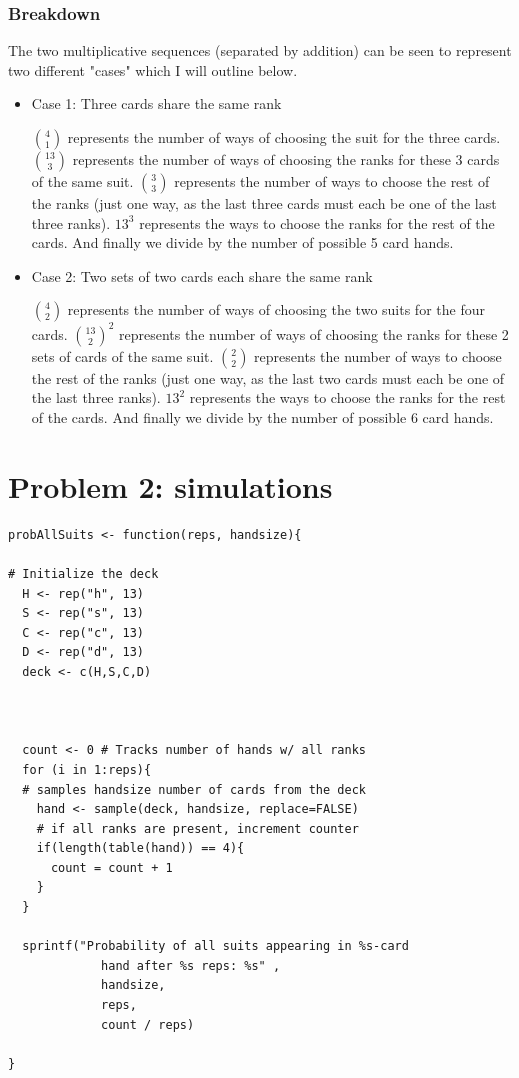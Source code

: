 \documentclass[11pt]{article}
\begin{document}
\subsubsection*{Breakdown}
\label{sec:org119f212}

The two multiplicative sequences (separated by addition) can be seen to represent two different "cases" which I will outline below.

\begin{itemize}
\item Case 1: Three cards share the same rank
\label{sec:org92897a5}

\({4}\choose{1}\) represents the number of ways of choosing the suit for the three cards. \({{13}\choose{3}}\) represents the number of ways of choosing the ranks for these 3 cards of the same suit. \({{3}\choose{3}}\) represents the number of ways to choose the rest of the ranks (just one way, as the last three cards must each be one of the last three ranks). \(13^{3}\) represents the ways to choose the ranks for the rest of the cards. And finally we divide by the number of possible 5 card hands.

\item Case 2: Two sets of two cards each share the same rank
\label{sec:orgfdb33ff}

\({4}\choose{2}\) represents the number of ways of choosing the two suits for the four cards. \({{13}\choose{2}}^{2}\) represents the number of ways of choosing the ranks for these 2 sets of cards of the same suit. \({{2}\choose{2}}\) represents the number of ways to choose the rest of the ranks (just one way, as the last two cards must each be one of the last three ranks). \(13^{2}\) represents the ways to choose the ranks for the rest of the cards. And finally we divide by the number of possible 6 card hands.
\end{itemize}

\section*{Problem 2: simulations}
\label{sec:org76c7cb4}

\begin{verbatim}
probAllSuits <- function(reps, handsize){

# Initialize the deck
  H <- rep("h", 13)
  S <- rep("s", 13)
  C <- rep("c", 13)
  D <- rep("d", 13)
  deck <- c(H,S,C,D)



  count <- 0 # Tracks number of hands w/ all ranks
  for (i in 1:reps){
  # samples handsize number of cards from the deck
    hand <- sample(deck, handsize, replace=FALSE)
    # if all ranks are present, increment counter
    if(length(table(hand)) == 4){
      count = count + 1
    }
  }

  sprintf("Probability of all suits appearing in %s-card 
             hand after %s reps: %s" ,
             handsize,
             reps,
             count / reps)

}


\end{verbatim}
\end{document}
